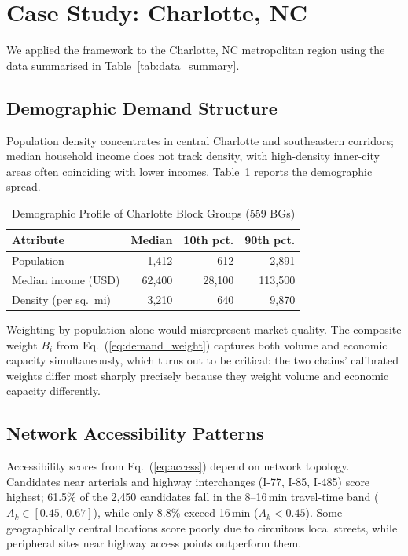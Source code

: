 \documentclass[conference]{IEEEtran}
\begin{document}
\section{Case Study: Charlotte, NC}
\label{sec:results}

We applied the framework to the Charlotte, NC metropolitan region
using the data summarised in Table~\ref{tab:data_summary}.

\subsection{Demographic Demand Structure}

Population density concentrates in central Charlotte and southeastern
corridors; median household income does not track density, with
high-density inner-city areas often coinciding with lower incomes.
Table~\ref{tab:demo} reports the demographic spread.

\begin{table}[!t]
\centering
\caption{Demographic Profile of Charlotte Block Groups (559 BGs)}
\label{tab:demo}
\begin{tabular}{lrrr}
\toprule
\textbf{Attribute} & \textbf{Median} & \textbf{10th pct.}
                   & \textbf{90th pct.} \\
\midrule
Population                  & 1{,}412 & 612    & 2{,}891    \\
Median income (USD)         & 62{,}400 & 28{,}100 & 113{,}500 \\
Density (per sq.\ mi)       & 3{,}210 & 640    & 9{,}870    \\
\bottomrule
\end{tabular}
\end{table}

Weighting by population alone would misrepresent market quality. The
composite weight $B_i$ from Eq.~(\ref{eq:demand_weight}) captures
both volume and economic capacity simultaneously, which turns out to
be critical: the two chains' calibrated weights differ most sharply
precisely because they weight volume and economic capacity differently.

\subsection{Network Accessibility Patterns}

Accessibility scores from Eq.~(\ref{eq:access}) depend on network
topology. Candidates near arterials and highway interchanges
(I-77, I-85, I-485) score highest; 61.5\% of the 2{,}450 candidates
fall in the 8--16\,min travel-time band ($A_k \in [0.45,\,0.67]$),
while only 8.8\% exceed 16\,min ($A_k < 0.45$). Some geographically
central locations score poorly due to circuitous local streets, while
peripheral sites near highway access points outperform them.
\end{document}
